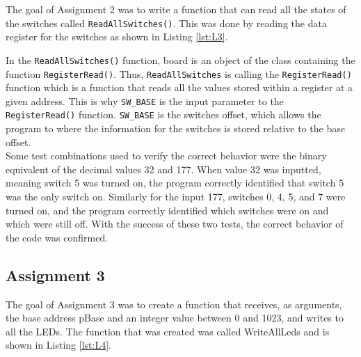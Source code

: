 \documentclass[
	letterpaper, %
	10pt, %
]{CSUniSchoolLabReport}
\begin{document}
The goal of Assignment 2 was to write a function that can read all the states of the switches called \texttt{ReadAllSwitches()}. This was done by reading the data register for the switches as shown in Listing \ref{lst:L3}.



In the \texttt{ReadAllSwitches()} function, board is an object of the class containing the function \texttt{RegisterRead()}. Thus, \texttt{ReadAllSwitches} is calling the \texttt{RegisterRead()} function which is a function that reads all the values stored within a register at a given address. This is why \texttt{SW\_BASE} is the input parameter to the \texttt{RegisterRead()} function. \texttt{SW\_BASE} is the switches offset, which allows the program to where the information for the switches is stored relative to the base offset. \\

Some test combinations used to verify the correct behavior were the binary equivalent of the decimal values 32 and 177.  When value 32 was inputted, meaning switch 5 was turned on, the program correctly identified that switch 5 was the only switch on. Similarly for the input 177, switches 0, 4, 5, and 7 were turned on, and the program correctly identified which switches were on and which were still off. With the success of these two tests, the correct behavior of the code was confirmed.

\subsection{Assignment 3}

The goal of Assignment 3 was to create a function that receives, as arguments, the base address pBase and an integer value between 0 and 1023, and writes to all the LEDs. The function that was created was called WriteAllLeds and is shown in Listing \ref{lst:L4}.
\end{document}
